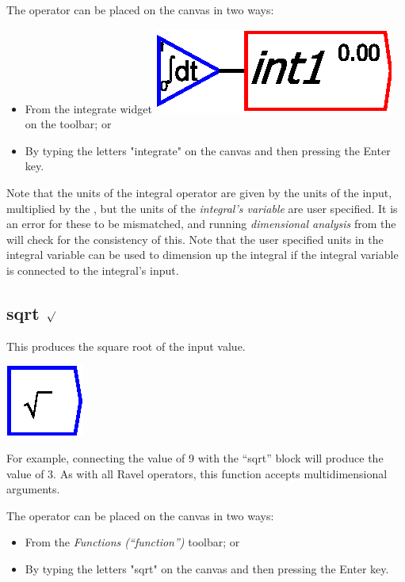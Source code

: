 The operator can be placed on the canvas in two ways:
\begin{itemize}
\item From the integrate widget \includegraphics{images/integral} on the
toolbar; or 
\item By typing the letters "integrate" on the canvas and then pressing
the Enter key.
\end{itemize}
Note that the units of the integral operator are given by the units
of the input, multiplied by the ,
but the units of the {\em integral's variable} are user specified.
It is an error for these to be mismatched, and running {\em dimensional
analysis} from the  will check for
the consistency of this. Note that the user specified units in the
integral variable can be used to dimension up the integral if the
integral variable is connected to the integral's input.

\subsection{sqrt $\protect\surd$}

\label{Operation:sqrt} This produces the square root of the input
value.

\includegraphics{images/squareRoot}

For example, connecting the value of 9 with the ``sqrt'' block will
produce the value of 3. As with all Ravel operators, this function
accepts multidimensional arguments.

The operator can be placed on the canvas in two ways:
\begin{itemize}
\item From the \emph{Functions (``function'')} toolbar; or 
\item By typing the letters "sqrt" on the canvas and then pressing the
Enter key. 
\end{itemize}


